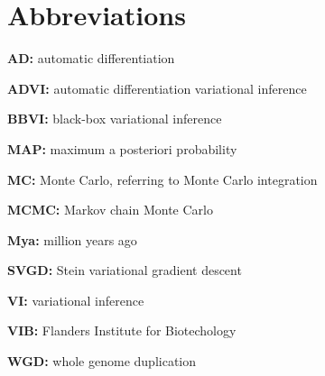 
\chapter*{Abbreviations}

\begin{description}    

    \item \textbf{AD: } automatic differentiation
    \item \textbf{ADVI: } automatic differentiation variational inference
    \item \textbf{BBVI: } black-box variational inference
    \item \textbf{MAP: } maximum a posteriori probability
    \item \textbf{MC: } Monte Carlo, referring to Monte Carlo integration
    \item \textbf{MCMC: } Markov chain Monte Carlo 
    \item \textbf{Mya: } million years ago
    \item \textbf{SVGD: } Stein variational gradient descent
    \item \textbf{VI: } variational inference
    \item \textbf{VIB: } Flanders Institute for Biotechology
    \item \textbf{WGD: } whole genome duplication

\end{description}